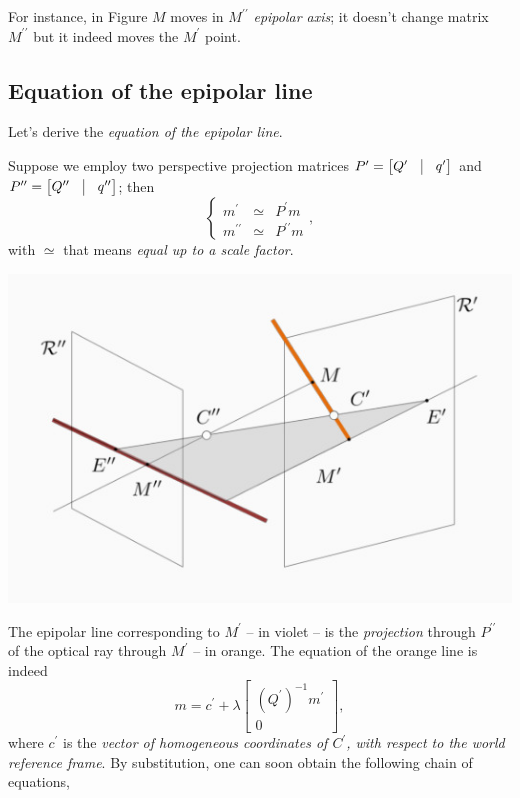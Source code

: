 \documentclass[10pt]{report}
\begin{document}
For instance, in Figure \(M\) moves in \(M^{\prime\prime}\) \emph{epipolar axis}; it doesn't change matrix \(M^{\prime\prime}\) but it indeed moves the \(M^\prime\) point.

\subsection{Equation of the epipolar line}
\label{sec:org76a79a7}
Let's derive the \emph{equation of the epipolar line}.

Suppose we employ two perspective projection matrices \(P^\prime = \begin{bmatrix} Q^\prime & \vline & q^\prime\end{bmatrix}\) and \(P^{\prime\prime} = \begin{bmatrix} Q^{\prime\prime} & \vline & q^{\prime\prime}\end{bmatrix}\); then $$\left\{\begin{array}{lll} m^\prime & \simeq & P^\prime m \\ m^{\prime\prime} & \simeq & P^{\prime\prime}m\end{array}\right.,$$ with \(\simeq\) that means \emph{equal up to a scale factor}.

\begin{center}
\includegraphics[width=.9\linewidth]{./pics/stereo/epipolar-equation.jpg}
\end{center}

The epipolar line corresponding to \(M^\prime\) -- in violet -- is the \emph{projection} through \(P^{\prime\prime}\) of the optical ray through \(M^\prime\) -- in orange. The equation of the orange line is indeed $$m = c^\prime + \lambda\begin{bmatrix}(Q^\prime)^{-1} m^\prime \\ 0 \end{bmatrix},$$ where \(c^\prime\) is the \emph{vector of homogeneous coordinates of \(C^\prime\), with respect to the world reference frame}. By substitution, one can soon obtain the following chain of equations,
\end{document}

